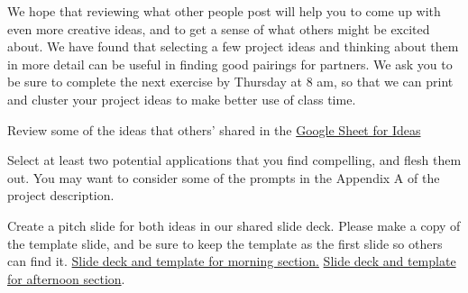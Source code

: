 \documentclass[assignment08_Solutions]{subfiles}
\begin{document}
\vspace{1em}
We hope that reviewing what other people post will help you to come up with even more creative ideas, and to get a sense of what others might be excited about. We have found that selecting a few project ideas and thinking about them in more detail can be useful in finding good pairings for partners. We ask you to be sure to complete the next exercise by Thursday at 8 am, so that we can print and cluster your project ideas to make better use of class time.
\vspace{1em}
\begin{exercise}
\bes
\item Review some of the ideas that others' shared in the \href{https://docs.google.com/spreadsheets/d/1hgZ_9C6l-iiWTn2BPQGgkwHQiP2nL0pPLvAcC5MrIPo/edit?usp=sharing}{Google Sheet for Ideas} 
\item Select at least two potential applications that you find compelling, and flesh them out. You may want to consider some of the prompts in the Appendix A of the project description.
\item Create a pitch slide for both ideas in our shared slide deck. Please make a copy of the template slide, and be sure to keep the template as the first slide so others can find it. \href{https://docs.google.com/presentation/d/1GgH_MhH1vHZ3FLmW3ikaDpZtWpBGUJTzSTuTktX49T8/edit?usp=sharing}{Slide deck and template for morning section.}  \href{https://docs.google.com/presentation/d/1IOXkjZY_5uL_XFaiCjZUL_GDlW7Ux3zv431i9tcxUR0/edit?usp=sharing}{Slide deck and template for afternoon section}.
\ees
\end{exercise}
\end{document}
